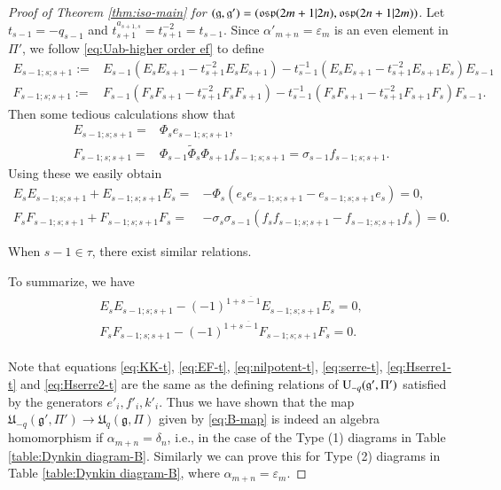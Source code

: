 \documentclass[12pt]{amsart}
\theoremstyle{definition}
\theoremstyle{remark}
\numberwithin{equation}{section}
\begin{document}
\begin{proof}[Proof of Theorem \ref{thm:iso-main} for $({{\mathfrak g}}, {{\mathfrak g}}')=({{\rm\mathfrak{osp}}}(2m+1|2n), {{\rm\mathfrak{osp}}}(2n+1|2m))$]
Let $t_{s-1}=-q_{s-1}$ and $t_{s+1}^{a_{s+1, s}}=t_{s+1}^{-2}=t_{s-1}$.
Since $\alpha'_{m+n}=\varepsilon_m$ is an even element in $\Pi'$, we follow  \eqref{eq:Uab-higher order ef} to define
\[\begin{aligned}
E_{s-1;s;s+1}
:=&E_{s-1}(E_{s}E_{s+1}-t_{s+1}^{-2}E_{s}E_{s+1})-t_{s-1}^{-1}(E_{s}E_{s+1}
-t_{s+1}^{-2} E_{s+1}E_{s})E_{s-1}\\
F_{s-1;s;s+1}
:=&F_{s-1}(F_{s}F_{s+1}-t_{s+1}^{-2}F_{s}F_{s+1})-t_{s-1}^{-1}(F_{s}F_{s+1}
-t_{s+1}^{-2} F_{s+1} F_{s}) F_{s-1}.
\end{aligned}
\]
Then some tedious calculations show that
\[\begin{aligned}
E_{s-1;s;s+1}=&\Phi_{s}e_{s-1;s;s+1},\\
F_{s-1;s;s+1}=&\Phi_{s-1}\tilde{\Phi}_{s}\Phi_{s+1}f_{s-1;s;s+1}
=\sigma_{s-1}f_{s-1;s;s+1}.
\end{aligned}\]
Using these we easily obtain
\[
\begin{aligned}
E_{s}E_{s-1;s;s+1}+E_{s-1;s;s+1}E_{s}
=&-\Phi_{s}(e_{s}e_{s-1;s;s+1}-e_{s-1;s;s+1}e_{s})=0,\\
F_{s}F_{s-1;s;s+1}+F_{s-1;s;s+1}F_{s}
=&-\sigma_{s}\sigma_{s-1}(f_{s}f_{s-1;s;s+1}-f_{s-1;s;s+1}f_{s})=0.
\end{aligned}
\]

When $s-1\in\tau$, there exist similar relations.

To summarize, we have
\begin{eqnarray}\label{eq:Hserre2-t}
\begin{aligned}
E_sE_{s-1;s;s+1} - (-1)^{1+\overline{s-1}}E_{s-1;s;s+1}E_s=0, \\
F_sF_{s-1;s;s+1} - (-1)^{1+\overline{s-1}}F_{s-1;s;s+1}F_s=0.
\end{aligned}
\end{eqnarray}

Note that equations \eqref{eq:KK-t}, \eqref{eq:EF-t},  \eqref{eq:nilpotent-t},  \eqref{eq:serre-t}, \eqref{eq:Hserre1-t}  and \eqref{eq:Hserre2-t} are
the same as the defining relations of ${{\rm U}}_{-q}({{\mathfrak g}}', \Pi')$ satisfied by
the generators $e'_i, f'_i, k'_i$. Thus we have shown that the map
${{\mathfrak U}}_{-q}({{\mathfrak g}}', \Pi')\longrightarrow {{\mathfrak U}}_q({{\mathfrak g}}, \Pi)$ given by \eqref{eq:B-map}
is indeed an algebra homomorphism if $\alpha_{m+n}=\delta_n$,
i.e., in the case of the Type (1) diagrams in Table \ref{table:Dynkin diagram-B}.
Similarly we can prove this for
Type (2) diagrams in Table \ref{table:Dynkin diagram-B}, where $\alpha_{m+n}=\varepsilon_m$.
\end{proof}
\end{document}
